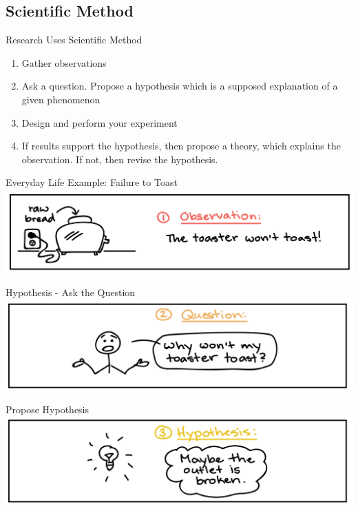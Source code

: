 \documentclass[11pt]{beamer}
\begin{document}
\subsection{Scientific Method}

\begin{frame}{Research Uses Scientific Method}
  \begin{enumerate}
  \item Gather observations
  \item Ask a question. Propose a hypothesis
    which is a supposed explanation of a given phenomenon
  \item Design and perform your experiment
  \item If results support the hypothesis, then propose
    a theory, which explains the observation. If not, then revise
    the hypothesis.
  \end{enumerate}
\end{frame}

\begin{frame}{Everyday Life Example: Failure to Toast}
  \centering
  \includegraphics[scale=1]{fail_toast}
\end{frame}

\begin{frame}{Hypothesis - Ask the Question}
  \centering
  \includegraphics[scale=1]{toast_q}
\end{frame}

\begin{frame}{Propose Hypothesis}
  \centering
  \includegraphics[scale=1]{toast_hypoth}
\end{frame}
\end{document}
